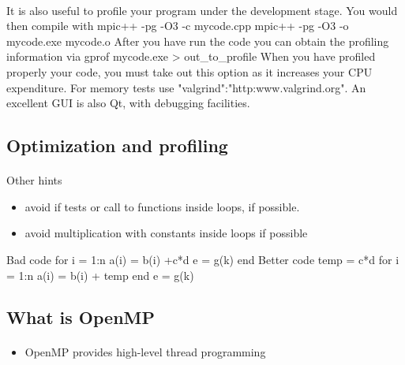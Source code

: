 \documentclass[%
twoside,                 %
final,                   %
10pt]{article}
\begin{document}
{%
\paragraph{}
It is also useful to profile your program under the development stage.
You would then compile with 
\bcppcod
mpic++  -pg -O3 -c  mycode.cpp
mpic++  -pg -O3 -o  mycode.exe  mycode.o
\ecppcod
After you have run the code you can obtain the profiling information via
\bcppcod
gprof mycode.exe >  out_to_profile
\ecppcod
When you have profiled properly your code, you must take out this option as it 
increases your CPU expenditure.
For memory tests use "valgrind":"http:www.valgrind.org". An excellent GUI is also Qt, with debugging facilities.


\subsection{Optimization and profiling}

\paragraph{}
Other hints
\begin{itemize}
\item avoid if tests or call to functions inside loops, if possible. 

\item avoid multiplication with constants inside loops if possible
\end{itemize}

\noindent
Bad code
\bcppcod
for i = 1:n
    a(i) = b(i) +c*d
    e = g(k)
end
\ecppcod
Better code
\bcppcod
temp = c*d
for i = 1:n
    a(i) = b(i) + temp
end
e = g(k)
\ecppcod



\subsection{What is OpenMP}

\paragraph{}
\begin{itemize}
\item OpenMP provides high-level thread programming


\end{itemize}}
\end{document}
